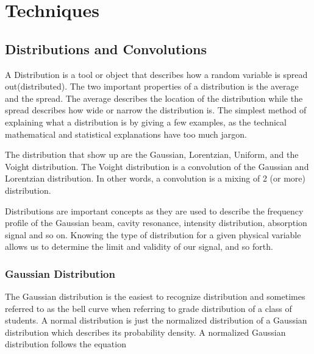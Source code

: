 \documentclass[a4paper]{book}
\begin{document}
\chapter{Techniques}

	\section{Distributions and Convolutions}
		\label{sec:Distribution}
		A Distribution is a tool or object that describes how a random variable is spread out(distributed). The two important properties of a distribution is the average and the spread. The average describes the location of the distribution while the spread describes how wide or narrow the distribution is. The simplest method of explaining what a distribution is by giving a few examples, as the technical mathematical and statistical explanations have too much jargon. 
		
		The distribution that show up are the Gaussian, Lorentzian, Uniform, and the Voight distribution. The Voight distribution is a convolution of the Gaussian and Lorentzian distribution. In other words, a convolution is a mixing of 2 (or more) distribution.
		
		Distributions are important concepts as they are used to describe the frequency profile of the Gaussian beam, cavity resonance, intensity distribution, absorption signal and so on. Knowing the type of distribution for a given physical variable allows us to determine the limit and validity of our signal, and so forth.
		
		\subsection{Gaussian Distribution}
			\label{ssec:GaussianDistribution}
			The Gaussian distribution is the easiest to recognize distribution and sometimes referred to as the bell curve when referring to grade distribution of a class of students. A normal distribution is just the normalized distribution of a Gaussian distribution which describes its probability density. A normalized Gaussian distribution follows the equation
		
\end{document}
